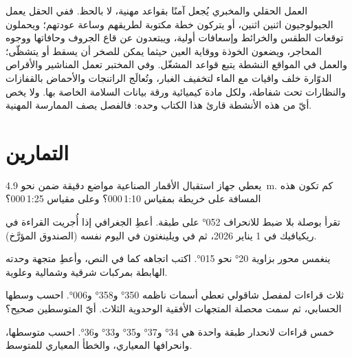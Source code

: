 \begin{safety}
العمل الحقلي والمخبري يُجعل آمنًا بقواعد مهنية، لا بالحظ. ففي الحقل يعمل الجيولوجيون اثنين اثنين، أو يتركون خطة مكتوبة لطريقهم وساعة عودتهم؛ ويحملون توقعات الطقس والخرائط وإسعافات أولية، ويبتعدون عن قاع الجروف وحافاتها ووجوه المحاجر، ويضعون الخوذة ووقاية العين حيثما يمكن للصخر أن يسقط أو يتشظّى؛ والعمل في المواقع النشطة يتبع قواعد المشغّل. وفي المختبر تعمل المناشير والأقراص الدوّارة خلف واقيات مع الماء لتخفيف الغبار، وتُعالَج الراتنجات والأحماض بالقفازات والنظارات تحت شفاطة، ولكل مادة كيميائية ورقة بيانات السلامة الخاصة بها. ولا يخص أيّ من هذه الأنشطة قارئ هذا الكتاب وحده: فالفصل يصف الممارسة المهنية.
\end{safety}

\section{التمارين}

\begin{exercise}[$\star$]\label{exo:b1:field-lab-methods-1:1}
يعطي جهاز استقبال الأقمار الصناعية مواضع دقيقة ضمن نحو \qty{4.9}{m}. كم تكون هذه المسافة على خريطة بمقياس 1:10\,000؟ وعلى مقياس 1:25\,000؟
\end{exercise}

\begin{exercise}[$\star$]\label{exo:b1:field-lab-methods-1:2}
تقرأ بوصلة بلا ضبط للانحراف  \ang{052} على طبقة. أعطِ  الجغرافي إذا أُجريت القراءة في ريكيافيك في 1 يناير 2026، ثم في ويلينغتون في اليوم نفسه (الصندوق المؤرَّخ).
\end{exercise}

\begin{exercise}[$\star$]\label{exo:b1:field-lab-methods-1:3}
ينغمس محور  بزاوية \ang{20} نحو \ang{015}. اكتب اتجاهه كما في النص، وأعطِ متجهة وحدته الهابطة بمركبات شرقية وشمالية وعلوية.
\end{exercise}

\begin{exercise}[$\star$]\label{exo:b1:field-lab-methods-1:4}
ثلاث قراءات لمفصل شاقولي تعطي أسمات ناظمه \ang{350} و\ang{358} و\ang{006}. احسب وسطها الحسابي، ثم سمت محصلة المتجهات الأفقية الوحدوية الثلاث. أيّ المتوسطين صحيح؟
\end{exercise}

\begin{exercise}[$\star\star$]\label{exo:b1:field-lab-methods-1:5}
خمس قراءات لانحدار طبقة واحدة هي \ang{34} و\ang{37} و\ang{35} و\ang{33} و\ang{36}. احسب متوسطها، وانحرافها المعياري، والخطأ المعياري للمتوسط.
\end{exercise}

